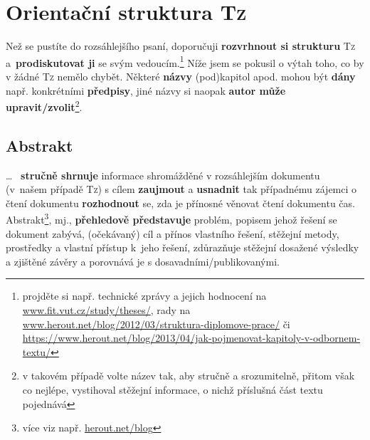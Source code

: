 \documentclass[a4paper,11pt, twoside]{report}
\begin{document}
\vspace{20mm}

\parbox{\linewidth}{
\centering

\scalebox{10.0}{
\faBug
}
}

\vspace{20mm}

\pagebreak

\chapter{Orientační struktura \textsc{Tz}}
\thispagestyle{fancy}

\raggedbottom

\label{chapt:tech-rep-struct}

\vspace{-6mm}

Než se pustíte do rozsáhlejšího psaní, 
doporučuji \textbf{rozvrhnout si strukturu} \textsc{Tz} a~\textbf{prodiskutovat ji} se svým vedoucím.\footnote{projděte si např. technické zprávy a jejich hodnocení na \url{www.fit.vut.cz/study/theses/},
rady na \url{www.herout.net/blog/2012/03/struktura-diplomove-prace/} či 
\url{https://www.herout.net/blog/2013/04/jak-pojmenovat-kapitoly-v-odbornem-textu/}
}
Níže jsem se pokusil o výtah toho, co by v žádné \textsc{Tz} nemělo chybět. 
Některé \textbf{názvy} (pod)kapitol apod. mohou být \textbf{dány} např. konkrétními \textbf{předpisy},
jiné názvy si naopak \textbf{autor může  upravit/zvolit}\footnote{v takovém případě volte název tak, aby stručně a srozumitelně, přitom však co nejlépe, vystihoval stěžejní informace, o nichž příslušná část textu pojednává}.


\section{Abstrakt}

\vspace{-1mm}

\ldots 
~\textbf{stručně shrnuje}
 informace shromážděné v rozsáhlejším dokumentu (v~našem případě \textsc{Tz}) s cílem \textbf{zaujmout} 
a \textbf{usnadnit} tak případnému zájemci o čtení dokumentu \textbf{rozhodnout} se,
zda je přínosné věnovat čtení dokumentu čas. 
%
Abstrakt\footnote{více viz např. \href{https://www.herout.net/blog/2013/12/jak-psat-abstrakt/}{herout.net/blog}}, mj.,  
\textbf{přehledově představuje} problém,
popisem jehož řešení se dokument zabývá, 
(očekávaný) cíl a přínos vlastního řešení,
stěžejní metody, prostředky a vlastní přístup k~jeho řešení,
zdůrazňuje stěžejní dosažené výsledky a zjištěné závěry
a porovnává je s dosavadními/publikovanými.
\end{document}
